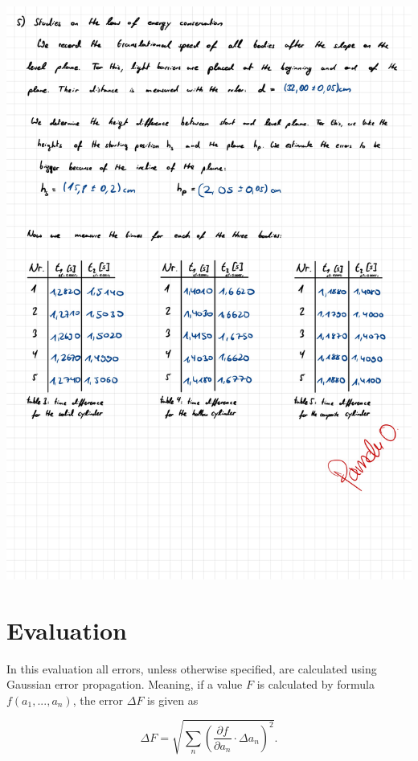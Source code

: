 \documentclass{article}
\begin{document}
\includegraphics[width=\textwidth]{graphics/mess3.jpg}
\newpage

\addtocounter{table}{5}

\section{Evaluation}

In this evaluation all errors, unless otherwise specified, are calculated using Gaussian error propagation. Meaning, if a value $F$ is calculated by formula $f(a_1, ..., a_n)$, the error $\Delta F$ is given as

\begin{equation}
    \Delta F = \sqrt{\sum_n \left( \frac{\partial f}{\partial a_n} \cdot \Delta a_n \right)^2}.
\end{equation}
\end{document}
